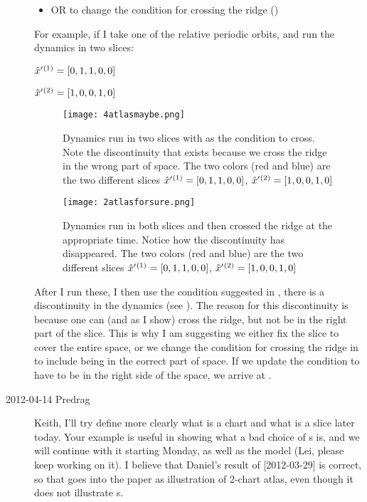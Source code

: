 \begin{description}
\begin{itemize}
        \item OR to change the condition for crossing the ridge ()
\end{itemize}
    For example, if I take one of the relative periodic orbits, and run the dynamics in two slices:
    \begin{center}
${\hat{x}'}{}^{(1)} = [0, 1, 1, 0, 0]$

${\hat{x}'}{}^{(2)} = [1, 0, 0, 1, 0]$
    \end{center}
     \begin{figure}
 \begin{center}
 \texttt{[image: 4atlasmaybe.png]}
 \end{center}
 \caption{Dynamics run in two slices with  as the
 condition to cross.  Note the discontinuity that exists because we cross
 the ridge in the wrong part of space.  The two colors (red and blue) are
 the two different slices ${\hat{x}'}{}^{(1)} = [0, 1, 1, 0, 0]$,
 ${\hat{x}'}{}^{(2)} = [1, 0, 0, 1, 0]$}{\label{fig:4chart}}
 \end{figure}
 \begin{figure}
 \begin{center}
 \texttt{[image: 2atlasforsure.png]}
 \end{center}
 \caption{Dynamics run in both slices and then crossed the ridge at the
 appropriate time.  Notice how the discontinuity has disappeared.  The
 two colors (red and blue) are the two different slices ${\hat{x}'}{}^{(1)}
 = [0, 1, 1, 0, 0]$, ${\hat{x}'}{}^{(2)} = [1, 0, 0, 1, 0]$
} {\label{fig:true2chart}}
 \end{figure}

After I run these, I then use the condition suggested in
, there is a discontinuity in the dynamics (see
).  The reason for this discontinuity is because one
can (and as I show) cross the ridge, but not be in the right part of the
slice.  This is why I am suggesting we either fix the slice to cover the
entire space, or we change the condition for crossing the ridge in
 to include being in the correct part of space.  If
we update the condition to have to be in the right side of the space, we
arrive at .

\item[2012-04-14 Predrag] Keith, I'll try define more clearly what is a
chart and what is a slice later today. Your example is useful in showing
what a bad choice of \template s is, and we will continue with it
starting Monday, as well as the {\twoMode} model (Lei, please keep working
on it). I believe that Daniel's result of [2012-03-29] is correct, so
that goes into the paper as illustration of 2-chart atlas, even though it
does not illustrate \chartBord s.


\end{description}
